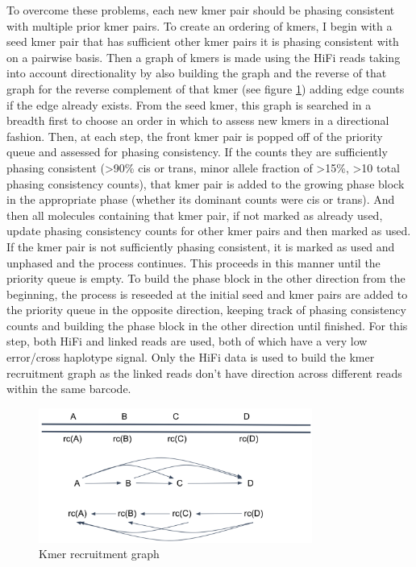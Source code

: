 {\par{
To overcome these problems, each new kmer pair should be phasing consistent with multiple prior kmer pairs. To create an ordering of kmers, I begin with a seed kmer pair that has sufficient other kmer pairs it is phasing consistent with on a pairwise basis. Then a graph of kmers is made using the HiFi reads taking into account directionality by also building the graph and the reverse of that graph for the reverse complement of that kmer (see figure \ref{figure:assemblygraph}) adding edge counts if the edge already exists. From the seed kmer, this graph is searched in a breadth first to choose an order in which to assess new kmers in a directional fashion. Then, at each step, the front kmer pair is popped off of the priority queue and assessed for phasing consistency. If the counts they are sufficiently phasing consistent (>90\% cis or trans, minor allele fraction of >15\%, >10 total phasing consistency counts), that kmer pair is added to the growing phase block in the appropriate phase (whether its dominant counts were cis or trans). And then all molecules containing that kmer pair, if not marked as already used, update phasing consistency counts for other kmer pairs and then marked as used. If the kmer pair is not sufficiently phasing consistent, it is marked as used and unphased and the process continues. This proceeds in this manner until the priority queue is empty. To build the phase block in the other direction from the beginning, the process is reseeded at the initial seed and kmer pairs are added to the priority queue in the opposite direction, keeping track of phasing consistency counts and building the phase block in the other direction until finished. For this step, both HiFi and linked reads are used, both of which have a very low error/cross haplotype signal. Only the HiFi data is used to build the kmer recruitment graph as the linked reads don't have direction across different reads within the same barcode.
}

\begin{figure}[htbp!]
\caption{Kmer recruitment graph}
\label{figure:assemblygraph}
\begin{centering}
\includegraphics[width=0.8\textwidth]{assemblygraph.png}
\end{centering}
\end{figure}

}
